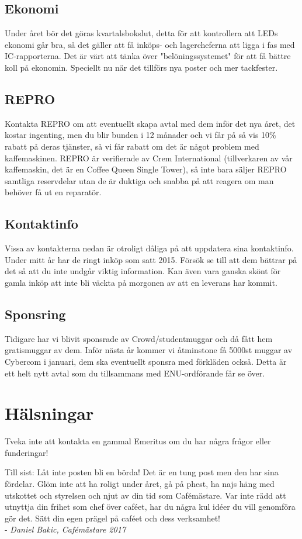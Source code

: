 \documentclass[10pt]{article}
\begin{document}
\subsection{Ekonomi}
Under året bör det göras kvartalsbokslut, detta för att kontrollera att LEDs ekonomi går bra, så det gäller att få inköps- och lagercheferna att ligga i fas med IC-rapporterna. Det är värt att tänka över "belöningssystemet" för att få bättre koll på ekonomin. Speciellt nu när det tillförs nya poster och mer tackfester.

\subsection{REPRO}
Kontakta REPRO om att eventuellt skapa avtal med dem inför det nya året, det kostar ingenting, men du blir bunden i 12 månader och vi får på så vis 10\% rabatt på deras tjänster, så vi får rabatt om det är något problem med kaffemaskinen. REPRO är verifierade av Crem International (tillverkaren av vår kaffemaskin, det är en Coffee Queen Single Tower), så inte bara säljer REPRO samtliga reservdelar utan de är duktiga och snabba på att reagera om man behöver få ut en reparatör.

\subsection{Kontaktinfo}
Vissa av kontakterna nedan är otroligt dåliga på att uppdatera sina kontaktinfo. Under mitt år har de ringt inköp som satt 2015. Försök se till att dem bättrar på det så att du inte undgår viktig information. Kan även vara ganska skönt för gamla inköp att inte bli väckta på morgonen av att en leverans har kommit.

\subsection{Sponsring}
Tidigare har vi blivit sponsrade av Crowd/studentmuggar och då fått hem gratismuggar av dem. Inför nästa år kommer vi åtminstone få 5000st muggar av Cybercom i januari, dem ska eventuellt sponsra med förkläden också. Detta är ett helt nytt avtal som du tillsammans med ENU-ordförande får se över.

\section{Hälsningar}
Tveka inte att kontakta en gammal Emeritus om du har några frågor eller funderingar!

Till sist: Låt inte posten bli en börda! Det är en tung post men den har sina fördelar. Glöm inte att ha roligt under året, gå på phest, ha najs häng med utskottet och styrelsen och njut av din tid som Cafémästare. Var inte rädd att utnyttja din frihet som chef över caféet, har du några kul idéer du vill genomföra gör det. Sätt din egen prägel på caféet och dess verksamhet!\\
- \textit{Daniel Bakic, Cafémästare 2017}
\end{document}
